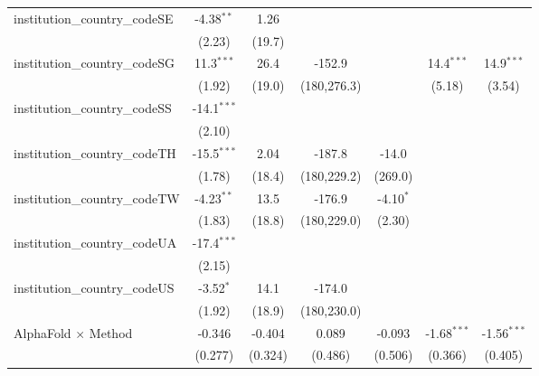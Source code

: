\begin{tabular}{lcccccc}
   institution\_country\_codeSE          & -4.38$^{**}$  & 1.26         &               &               &               &   \\   
                                         & (2.23)        & (19.7)       &               &               &               &   \\   
   institution\_country\_codeSG          & 11.3$^{***}$  & 26.4         & -152.9        &               & 14.4$^{***}$  & 14.9$^{***}$\\   
                                         & (1.92)        & (19.0)       & (180,276.3)   &               & (5.18)        & (3.54)\\   
   institution\_country\_codeSS          & -14.1$^{***}$ &              &               &               &               &   \\   
                                         & (2.10)        &              &               &               &               &   \\   
   institution\_country\_codeTH          & -15.5$^{***}$ & 2.04         & -187.8        & -14.0         &               &   \\   
                                         & (1.78)        & (18.4)       & (180,229.2)   & (269.0)       &               &   \\   
   institution\_country\_codeTW          & -4.23$^{**}$  & 13.5         & -176.9        & -4.10$^{*}$   &               &   \\   
                                         & (1.83)        & (18.8)       & (180,229.0)   & (2.30)        &               &   \\   
   institution\_country\_codeUA          & -17.4$^{***}$ &              &               &               &               &   \\   
                                         & (2.15)        &              &               &               &               &   \\   
   institution\_country\_codeUS          & -3.52$^{*}$   & 14.1         & -174.0        &               &               &   \\   
                                         & (1.92)        & (18.9)       & (180,230.0)   &               &               &   \\   
   AlphaFold $\times$ Method             & -0.346        & -0.404       & 0.089         & -0.093        & -1.68$^{***}$ & -1.56$^{***}$\\   
                                         & (0.277)       & (0.324)      & (0.486)       & (0.506)       & (0.366)       & (0.405)\\   

\end{tabular}
